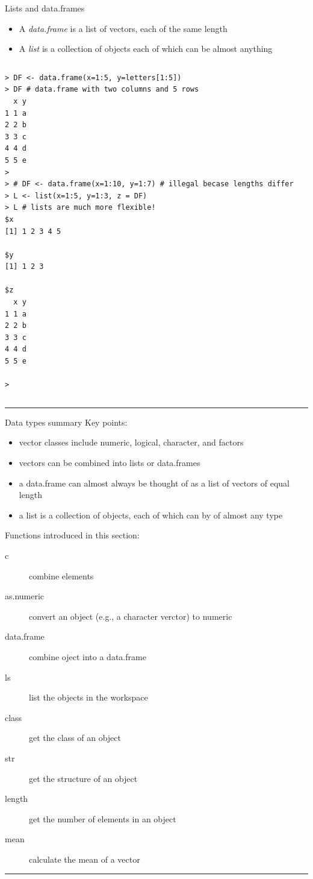 \documentclass[table,smaller]{beamer}
\begin{document}
\begin{frame}[fragile,label=sec-2-4]{Lists and data.frames}
 \begin{itemize}
\item A \emph{data.frame} is a list of vectors, each of the same length
\item A \emph{list} is a collection of objects each of which can be almost anything
\end{itemize}

\vspace{-.5em}
\begin{columns}
\begin{block}{}
\begin{verbatim}
> DF <- data.frame(x=1:5, y=letters[1:5])
> DF # data.frame with two columns and 5 rows
  x y
1 1 a
2 2 b
3 3 c
4 4 d
5 5 e
> 
> # DF <- data.frame(x=1:10, y=1:7) # illegal becase lengths differ
> L <- list(x=1:5, y=1:3, z = DF)
> L # lists are much more flexible!
$x
[1] 1 2 3 4 5

$y
[1] 1 2 3

$z
  x y
1 1 a
2 2 b
3 3 c
4 4 d
5 5 e

>
\end{verbatim}
\end{block}
\end{columns}
\vspace{.5em}

\rule{\linewidth}{0.5pt}
\end{frame}
\begin{frame}[label=sec-2-5]{Data types summary}
Key points:
\begin{itemize}
\item vector classes include numeric, logical, character, and factors
\item vectors can be combined into lists or  data.frames
\item a data.frame can almost always be thought of as a list of vectors of equal length
\item a list is a collection of objects, each of which can by of almost any type
\end{itemize}
Functions introduced in this section: 
\begin{description}
\item[{c}] combine elements
\item[{as.numeric}] convert an object (e.g., a character verctor) to numeric
\item[{data.frame}] combine oject into a data.frame
\item[{ls}] list the objects in the workspace
\item[{class}] get the class of an object
\item[{str}] get the structure of an object
\item[{length}] get the number of elements in an object
\item[{mean}] calculate the mean of a vector
\end{description}

\rule{\linewidth}{0.5pt}
\end{frame}
\end{document}
